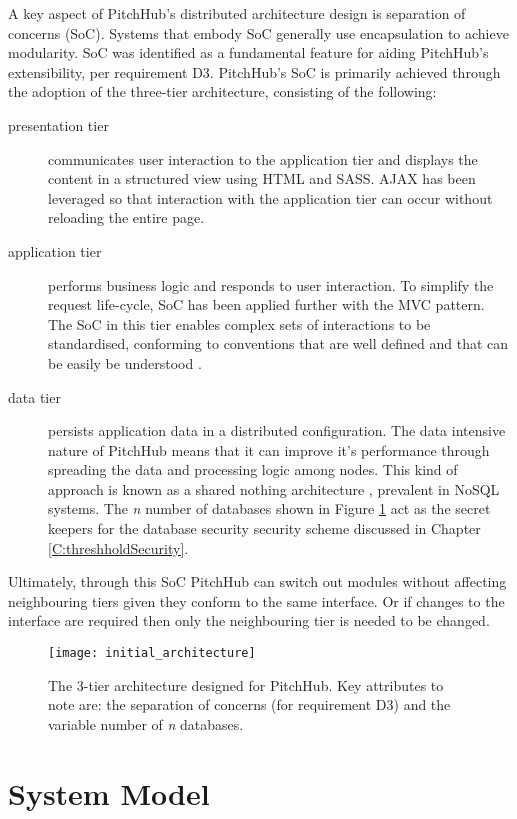 A key aspect of PitchHub's distributed architecture design is separation of concerns (SoC). Systems that embody SoC generally use encapsulation to achieve modularity. SoC was identified as a fundamental feature for aiding PitchHub's extensibility, per requirement D3. PitchHub's SoC is primarily achieved through the adoption of the three-tier architecture, consisting of the following: 

\begin{description}
  \item[presentation tier] communicates user interaction to the application tier and displays the content in a structured view using HTML and SASS. AJAX has been leveraged so that interaction with the application tier can occur without reloading the entire page.
  \item[application tier] performs business logic and responds to user interaction. To simplify the request life-cycle, SoC has been applied further with the MVC pattern. The SoC in this tier enables complex sets of interactions to be standardised, conforming to conventions that are well defined and that can be easily be understood \cite{leff2001web}.
  \item[data tier] persists application data in a distributed configuration. The data intensive nature of PitchHub means that it can improve it's performance through spreading the data and processing logic among nodes. This kind of approach is known as a shared nothing architecture \cite{stonebraker1986case}, prevalent in NoSQL systems. The \textit{n} number of databases shown in Figure \ref{fig:architecture_1} act as the secret keepers for the database security security scheme discussed in Chapter \ref{C:threshholdSecurity}.
\end{description}

Ultimately, through this SoC PitchHub can switch out modules without affecting neighbouring tiers given they conform to the same interface. Or if changes to the interface are required then only the neighbouring tier is needed to be changed. 

\begin{figure}[ht]
    \centering
    \texttt{[image: initial\_architecture]}
    \caption{The 3-tier architecture designed for PitchHub. Key attributes to note are: the separation of concerns (for requirement D3) and the variable number of \textit{n} databases.}
    \label{fig:architecture_1}
\end{figure}

\section{System Model}\label{S:systemModel}

